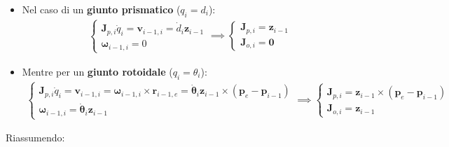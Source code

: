 \begin{itemize}
	\item Nel caso di un \textbf{giunto prismatico} ($q_i = d_i$):
	\begin{align*}
		\begin{cases}
			\bm{J}_{p,i}\dot{q}_i = \bm{v}_{i-1,i} = \dot{d}_i \bm{z}_{i-1} \\
			\bm{\omega}_{i-1, i} = 0
		\end{cases}
		\implies
		\begin{cases}
			\bm{J}_{p,i} = \bm{z}_{i-1} \\
			\bm{J}_{o,i} = \bm{0}
		\end{cases}
	\end{align*}
	\item Mentre per un \textbf{giunto rotoidale} ($q_i = \theta_i$):
	\begin{align*}
		\begin{cases}
			\bm{J}_{p,i}\dot{q}_i = \bm{v}_{i-1,i} = \bm{\omega}_{i-1,i} \times \bm{r}_{i-1,e} = \dot{\bm{\theta}}_i\bm{z}_{i-1} \times (\bm{p}_e - \bm{p}_{i-1}) \\
			\bm{\omega}_{i-1,i} = \dot{\bm{\theta}}_i\bm{z}_{i-1}
		\end{cases}
		\implies
		\begin{cases}
			\bm{J}_{p,i} = \bm{z}_{i-1} \times (\bm{p}_e - \bm{p}_{i-1}) \\
			\bm{J}_{o,i} = \bm{z}_{i-1}
		\end{cases}
	\end{align*}
\end{itemize}


\vspace*{10pt}
Riassumendo:

\setlength{\fboxsep}{0pt} %



